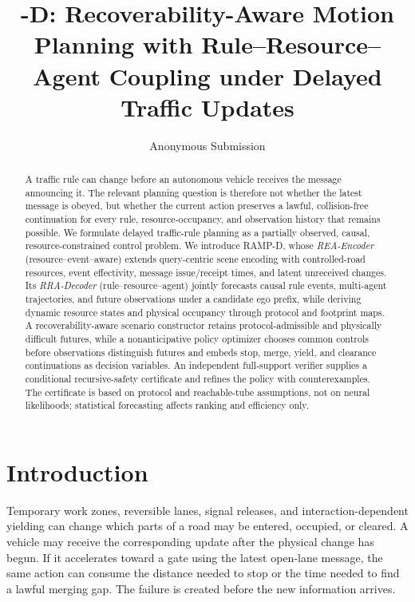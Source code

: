 \documentclass[letterpaper]{article} %
\title{\RAMP-D: Recoverability-Aware Motion Planning with Rule--Resource--Agent Coupling under Delayed Traffic Updates}
\author{Anonymous Submission}
\newcommand{\RAMP}{\textsc{RAMP}}
\begin{document}
\maketitle

\begin{abstract}
A traffic rule can change before an autonomous vehicle receives the message announcing it. The relevant planning question is therefore not whether the latest message is obeyed, but whether the current action preserves a lawful, collision-free continuation for every rule, resource-occupancy, and observation history that remains possible. We formulate delayed traffic-rule planning as a partially observed, causal, resource-constrained control problem. We introduce \RAMP-D, whose \emph{REA-Encoder} (resource--event--aware) extends query-centric scene encoding with controlled-road resources, event effectivity, message issue/receipt times, and latent unreceived changes. Its \emph{RRA-Decoder} (rule--resource--agent) jointly forecasts causal rule events, multi-agent trajectories, and future observations under a candidate ego prefix, while deriving dynamic resource states and physical occupancy through protocol and footprint maps. A recoverability-aware scenario constructor retains protocol-admissible and physically difficult futures, while a nonanticipative policy optimizer chooses common controls before observations distinguish futures and embeds stop, merge, yield, and clearance continuations as decision variables. An independent full-support verifier supplies a conditional recursive-safety certificate and refines the policy with counterexamples. The certificate is based on protocol and reachable-tube assumptions, not on neural likelihoods; statistical forecasting affects ranking and efficiency only.
\end{abstract}

\section{Introduction}
Temporary work zones, reversible lanes, signal releases, and interaction-dependent yielding can change which parts of a road may be entered, occupied, or cleared. A vehicle may receive the corresponding update after the physical change has begun. If it accelerates toward a gate using the latest open-lane message, the same action can consume the distance needed to stop or the time needed to find a lawful merging gap. The failure is created before the new information arrives.
\end{document}
